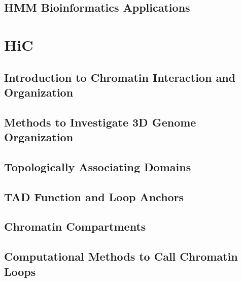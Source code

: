 \documentclass[
]{book}
\begin{document}
\hypertarget{hmm-bioinformatics-applications}{%
\section{HMM Bioinformatics Applications}\label{hmm-bioinformatics-applications}}

\hypertarget{Hic}{%
\chapter{HiC}\label{Hic}}

\hypertarget{introduction-to-chromatin-interaction-and-organization}{%
\section{Introduction to Chromatin Interaction and Organization}\label{introduction-to-chromatin-interaction-and-organization}}

\hypertarget{methods-to-investigate-3d-genome-organization}{%
\section{Methods to Investigate 3D Genome Organization}\label{methods-to-investigate-3d-genome-organization}}

\hypertarget{topologically-associating-domains}{%
\section{Topologically Associating Domains}\label{topologically-associating-domains}}

\hypertarget{tad-function-and-loop-anchors}{%
\section{TAD Function and Loop Anchors}\label{tad-function-and-loop-anchors}}

\hypertarget{chromatin-compartments}{%
\section{Chromatin Compartments}\label{chromatin-compartments}}

\hypertarget{computational-methods-to-call-chromatin-loops}{%
\section{Computational Methods to Call Chromatin Loops}\label{computational-methods-to-call-chromatin-loops}}
\end{document}

